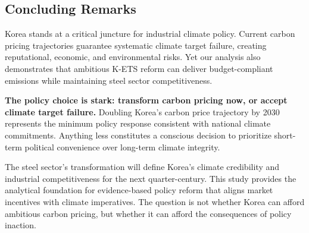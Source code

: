 \documentclass[preprint,5p,authoryear]{elsarticle}
\begin{document}
\subsection{Concluding Remarks}

Korea stands at a critical juncture for industrial climate policy. Current carbon pricing trajectories guarantee systematic climate target failure, creating reputational, economic, and environmental risks. Yet our analysis also demonstrates that ambitious K-ETS reform can deliver budget-compliant emissions while maintaining steel sector competitiveness.

\textbf{The policy choice is stark: transform carbon pricing now, or accept climate target failure.} Doubling Korea's carbon price trajectory by 2030 represents the minimum policy response consistent with national climate commitments. Anything less constitutes a conscious decision to prioritize short-term political convenience over long-term climate integrity.

The steel sector's transformation will define Korea's climate credibility and industrial competitiveness for the next quarter-century. This study provides the analytical foundation for evidence-based policy reform that aligns market incentives with climate imperatives. The question is not whether Korea can afford ambitious carbon pricing, but whether it can afford the consequences of policy inaction.




\end{document}
